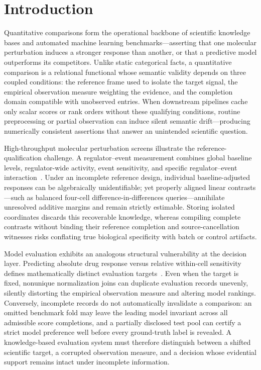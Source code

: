 \documentclass[preprint,12pt,number,sort&compress]{elsarticle}
\begin{document}
\section{Introduction}\label{sec:intro}
Quantitative comparisons form the operational backbone of scientific knowledge bases and automated machine learning benchmarks---asserting that one molecular perturbation induces a stronger response than another, or that a predictive model outperforms its competitors. Unlike static categorical facts, a quantitative comparison is a relational functional whose semantic validity depends on three coupled conditions: the reference frame used to isolate the target signal, the empirical observation measure weighting the evidence, and the completion domain compatible with unobserved entries. When downstream pipelines cache only scalar scores or rank orders without these qualifying conditions, routine preprocessing or partial observation can induce silent semantic drift---producing numerically consistent assertions that answer an unintended scientific question.

High-throughput molecular perturbation screens illustrate the reference-qualification challenge. A regulator--event measurement combines global baseline levels, regulator-wide activity, event sensitivity, and specific regulator--event interaction~\cite{tian2017apa,kowalski2024cpa}. Under an incomplete reference design, individual baseline-adjusted responses can be algebraically unidentifiable; yet properly aligned linear contrasts---such as balanced four-cell difference-in-differences queries---annihilate unresolved additive margins and remain strictly estimable. Storing isolated coordinates discards this recoverable knowledge, whereas compiling complete contrasts without binding their reference completion and source-cancellation witnesses risks conflating true biological specificity with batch or control artifacts.

Model evaluation exhibits an analogous structural vulnerability at the decision layer. Predicting absolute drug response versus relative within-cell sensitivity defines mathematically distinct evaluation targets~\cite{bernett2026dreval}. Even when the target is fixed, nonunique normalization joins can duplicate evaluation records unevenly, silently distorting the empirical observation measure and altering model rankings. Conversely, incomplete records do not automatically invalidate a comparison: an omitted benchmark fold may leave the leading model invariant across all admissible score completions, and a partially disclosed test pool can certify a strict model preference well before every ground-truth label is revealed. A knowledge-based evaluation system must therefore distinguish between a shifted scientific target, a corrupted observation measure, and a decision whose evidential support remains intact under incomplete information.
\end{document}
